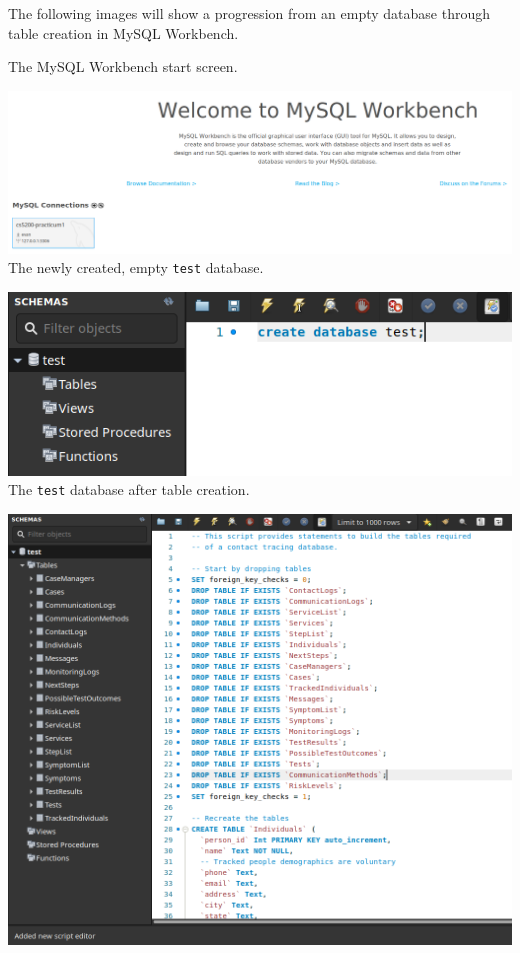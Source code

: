 \documentclass[
]{article}
\begin{document}
The following images will show a progression from an empty database
through table creation in MySQL Workbench.

The MySQL Workbench start screen.

\includegraphics{imgs/MySQLWorkbench-IntroScreen.png}\\

The newly created, empty \texttt{test} database.

\includegraphics{imgs/MySQLWorkbench-emptydb.png}\\

The \texttt{test} database after table creation.

\includegraphics{imgs/MySQLWorkbench-create.png}\\
\end{document}
